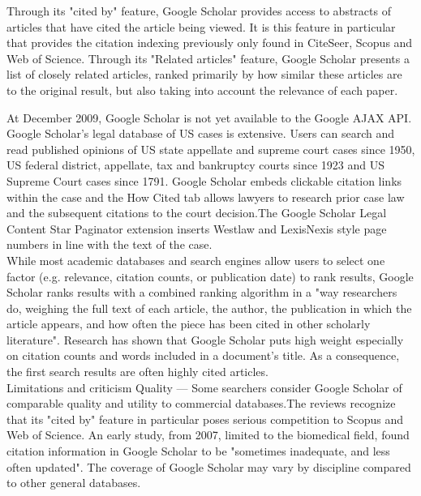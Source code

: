 \begin{enumerate}
	Through its "cited by" feature, Google Scholar provides access to abstracts of articles that have cited the article being viewed. It is this feature in particular that provides the citation indexing previously only found in CiteSeer, Scopus and Web of Science. Through its "Related articles" feature, Google Scholar presents a list of closely related articles, ranked primarily by how similar these articles are to the original result, but also taking into account the relevance of each paper.
	
	At December 2009, Google Scholar is not yet available to the Google AJAX API.\\
	
	Google Scholar's legal database of US cases is extensive. Users can search and read published opinions of US state appellate and supreme court cases since 1950, US federal district, appellate, tax and bankruptcy courts since 1923 and US Supreme Court cases since 1791. Google Scholar embeds clickable citation links within the case and the How Cited tab allows lawyers to research prior case law and the subsequent citations to the court decision.The Google Scholar Legal Content Star Paginator extension inserts Westlaw and LexisNexis style page numbers in line with the text of the case.\\
	
	While most academic databases and search engines allow users to select one factor (e.g. relevance, citation counts, or publication date) to rank results, Google Scholar ranks results with a combined ranking algorithm in a "way researchers do, weighing the full text of each article, the author, the publication in which the article appears, and how often the piece has been cited in other scholarly literature". Research has shown that Google Scholar puts high weight especially on citation counts and words included in a document's title. As a consequence, the first search results are often highly cited articles.\\
		
	Limitations and criticism
	Quality — Some searchers consider Google Scholar of comparable quality and utility to commercial databases.The reviews recognize that its "cited by" feature in particular poses serious competition to Scopus and Web of Science. An early study, from 2007, limited to the biomedical field, found citation information in Google Scholar to be "sometimes inadequate, and less often updated". The coverage of Google Scholar may vary by discipline compared to other general databases.
	

\end{enumerate}
